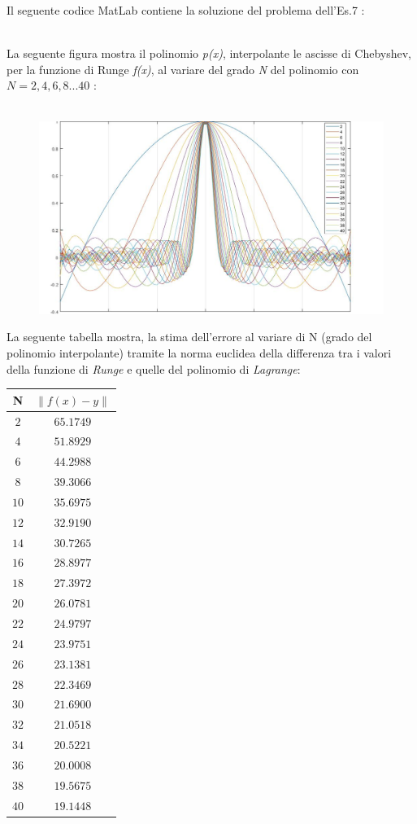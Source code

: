 Il seguente codice MatLab contiene la soluzione del problema dell'Es.7 :\\\
	
La seguente figura mostra il polinomio \textit{p(x)}, interpolante le ascisse di Chebyshev, per la funzione di Runge \textit{f(x)}, al variare del grado \textit{N} del polinomio con $N=2,4,6,8...40$ :\\\
	\begin{figure}[H]
  		\label{Cap_4_Es_7}
  		\includegraphics[width=\textwidth]{Plot/Cap_4_Es_7}
	\end{figure}
La seguente tabella mostra, la stima dell'errore al variare di N (grado del polinomio interpolante) tramite la norma euclidea 
della differenza tra i valori della funzione di \textit{Runge} e quelle del polinomio di \textit{Lagrange}:
	\begin{center}
		\begin{tabular}{|c|c|}
			\hline
				N & $\|f(x)-y\|$ \\
    			\hline
    				$2$  & $65.1749$ \\
    				$4$  & $51.8929$ \\
    				$6$  & $44.2988$ \\
    				$8$  & $39.3066$ \\
    				$10$ & $35.6975$ \\
    				$12$ & $32.9190$ \\
    				$14$ & $30.7265$ \\
    				$16$ & $28.8977$ \\
    				$18$ & $27.3972$ \\
    				$20$ & $26.0781$ \\
    				$22$ & $24.9797$ \\
   					$24$ & $23.9751$ \\
    				$26$ & $23.1381$ \\
    				$28$ & $22.3469$ \\
    				$30$ & $21.6900$ \\
    				$32$ & $21.0518$ \\
    				$34$ & $20.5221$ \\
    				$36$ & $20.0008$ \\
    				$38$ & $19.5675$ \\
    				$40$ & $19.1448$ \\
				\hline
		\end{tabular}
	\end{center} 